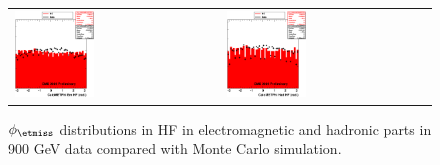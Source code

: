 \begin{figure}[h!]
 \centering
 \begin{tabular}{ll}
  \includegraphics[width=0.40\textwidth]{plots_DataVsMC_MB_900GeV/my_calometEmHFPhi.eps} &
  \includegraphics[width=0.40\textwidth]{plots_DataVsMC_MB_900GeV/my_calometHadHFPhi.eps} \\
 \end{tabular}
 \caption{$\phi_{\etmiss}$ distributions in HF in electromagnetic and hadronic parts in 900 GeV data compared
   with Monte Carlo simulation.
          \label{fig:DataVsMC_MB_900_10}}
\end{figure}


\clearpage

